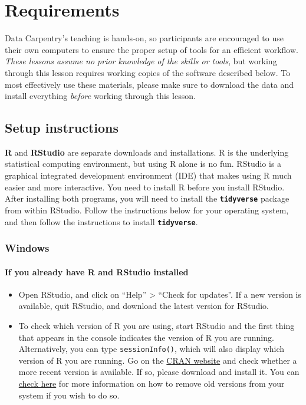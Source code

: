 \documentclass[]{book}
\providecommand{\tightlist}{%
  \setlength{\itemsep}{0pt}\setlength{\parskip}{0pt}}
\let\oldparagraph\paragraph
\renewcommand{\paragraph}[1]{\oldparagraph{#1}\mbox{}}
\begin{document}
\section{Requirements}\label{requirements}

Data Carpentry's teaching is hands-on, so participants are encouraged to
use their own computers to ensure the proper setup of tools for an
efficient workflow. \emph{These lessons assume no prior knowledge of the
skills or tools}, but working through this lesson requires working
copies of the software described below. To most effectively use these
materials, please make sure to download the data and install everything
\emph{before} working through this lesson.

\subsection{Setup instructions}\label{setup-instructions}

\textbf{R} and \textbf{RStudio} are separate downloads and
installations. R is the underlying statistical computing environment,
but using R alone is no fun. RStudio is a graphical integrated
development environment (IDE) that makes using R much easier and more
interactive. You need to install R before you install RStudio. After
installing both programs, you will need to install the
\textbf{\texttt{tidyverse}} package from within RStudio. Follow the
instructions below for your operating system, and then follow the
instructions to install \textbf{\texttt{tidyverse}}.

\subsubsection{Windows}\label{windows}

\paragraph{If you already have R and RStudio
installed}\label{if-you-already-have-r-and-rstudio-installed}

\begin{itemize}
\tightlist
\item
  Open RStudio, and click on ``Help'' \textgreater{} ``Check for
  updates''. If a new version is available, quit RStudio, and download
  the latest version for RStudio.
\item
  To check which version of R you are using, start RStudio and the first
  thing that appears in the console indicates the version of R you are
  running. Alternatively, you can type \texttt{sessionInfo()}, which
  will also display which version of R you are running. Go on the
  \href{https://cran.r-project.org/bin/windows/base/}{CRAN website} and
  check whether a more recent version is available. If so, please
  download and install it. You can
  \href{https://cran.r-project.org/bin/windows/base/rw-FAQ.html\#How-do-I-UNinstall-R_003f}{check
  here} for more information on how to remove old versions from your
  system if you wish to do so.
\end{itemize}
\end{document}
